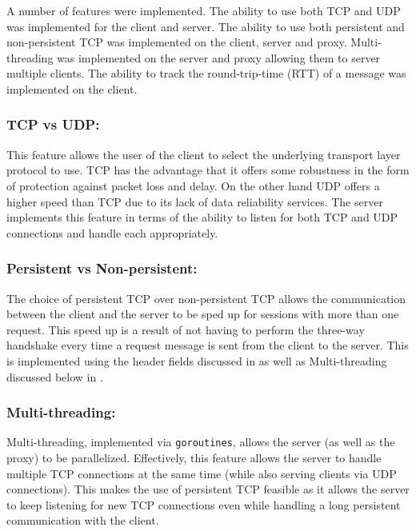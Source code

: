 \documentclass[10pt,twocolumn]{witseiepaper}
\begin{document}
A number of features were implemented. The ability to use both TCP and UDP was implemented for the client and server. The ability to use both persistent and non-persistent TCP was implemented on the client, server and proxy. Multi-threading was implemented on the server and proxy allowing them to server multiple clients. The ability to track the round-trip-time (RTT) of a message was implemented on the client.

	\subsubsection{TCP vs UDP:}

	This feature allows the user of the client to select the underlying transport layer protocol to use. TCP has the advantage that it offers some robustness in the form of protection against packet loss and delay. On the other hand UDP offers a higher speed than TCP due to its lack of data reliability services. The server implements this feature in terms of the ability to listen for both TCP and UDP connections and handle each appropriately. 

	\subsubsection{Persistent vs Non-persistent:}

	The choice of persistent TCP over non-persistent TCP allows the communication between the client and the server to be sped up for sessions with more than one request. This speed up is a result of not having to perform the three-way handshake every time a request message is sent from the client to the server. This is implemented using the header fields discussed in  as well as Multi-threading discussed below in .

	\subsubsection{Multi-threading:} \label{thread}

	Multi-threading, implemented via \verb|goroutines|, allows the server (as well as the proxy) to be parallelized. Effectively, this feature allows the server to handle multiple TCP connections at the same time (while also serving clients via UDP connections). This makes the use of persistent TCP feasible as it allows the server to keep listening for new TCP connections even while handling a long persistent communication with the client.
\end{document}
